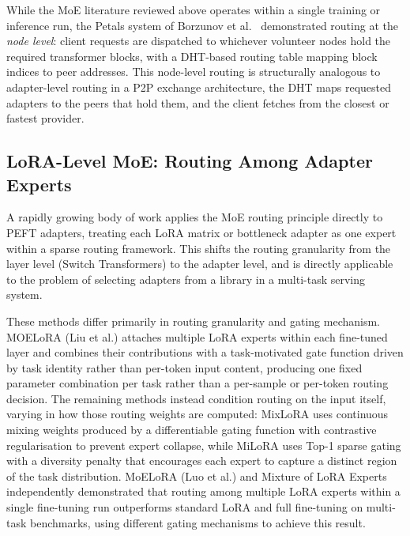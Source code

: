 While the MoE literature reviewed above operates within a single training or inference
run, the Petals system of Borzunov et al.~\cite{Borzunov2023} demonstrated routing at the
\textit{node level}: client requests are dispatched to whichever volunteer nodes
hold the required transformer blocks, with a DHT-based routing table mapping block
indices to peer addresses. This node-level routing is structurally analogous to
adapter-level routing in a P2P exchange architecture, the DHT maps requested adapters to
the peers that hold them, and the client fetches from the closest or fastest provider.

\subsection{LoRA-Level MoE: Routing Among Adapter Experts}
\label{sec:moe_routing:lora_moe}

A rapidly growing body of work applies the MoE routing principle directly to PEFT
adapters, treating each LoRA matrix or bottleneck adapter as one expert within a
sparse routing framework. This shifts the routing granularity from the layer level
(Switch Transformers) to the adapter level, and is directly applicable to the problem
of selecting adapters from a library in a multi-task serving system.

These methods differ primarily in routing granularity and gating mechanism.
MOELoRA (Liu et al.) \cite{LiuWhenMOE2024} attaches multiple LoRA experts within each
fine-tuned layer and combines their contributions with a task-motivated gate function
driven by task identity rather than per-token input content, producing one fixed
parameter combination per task rather than a per-sample or per-token routing decision.
The remaining methods instead condition routing on the input itself, varying in how
those routing weights are
computed: MixLoRA \cite{LiMixLoRA2024} uses continuous mixing weights produced by a
differentiable gating function with contrastive regularisation to prevent expert collapse,
while MiLoRA \cite{ZhangMiLoRA2024} uses Top-1 sparse gating with a diversity penalty
that encourages each expert to capture a distinct region of the task distribution.
MoELoRA (Luo et al.) \cite{LuoMoELoRA2024} and Mixture of LoRA Experts \cite{WuMixtureLoRA2024}
independently demonstrated that routing among multiple LoRA experts within a single
fine-tuning run outperforms standard LoRA and full fine-tuning on multi-task benchmarks,
using different gating mechanisms to achieve this result.

